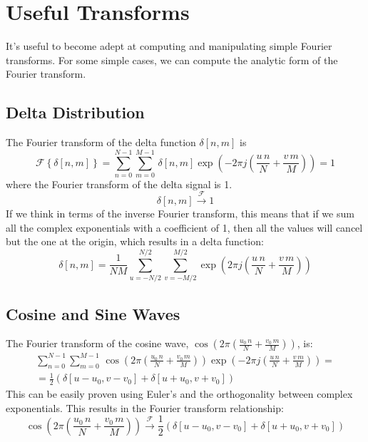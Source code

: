 \section{Useful Transforms}

It's useful to become adept at computing and manipulating
simple Fourier transforms.  For some simple cases, we can compute the analytic form of the Fourier transform.

\subsection{Delta Distribution}

The Fourier transform of the delta function $\delta \left[n,m \right]$ is
\begin{equation}
\mathcal{F} \left\{ \delta \left[n,m \right] \right\} = 
\sum_{n=0}^{N-1} \sum_{m=0}^{M-1} \, \delta \left[n,m \right] 
\exp{ \left( -2\pi j \left( \frac{u\, n}{N} + \frac{v\, m}{M} \right) \right)} = 1
\end{equation}
where the Fourier transform of the delta signal is 1. 
\begin{equation}
\delta \left[n,m \right] \xrightarrow{\mathscr{F}} 1
\end{equation}
If we think in terms of the inverse Fourier transform, this means that if we sum all the complex exponentials with a coefficient of 1, then all the values will cancel but the one at the origin, which results in a delta function:
\begin{equation}
\delta \left[n,m \right] = \frac{1}{NM} \sum_{u=-N/2}^{N/2} \sum_{v=-M/2}^{M/2}  
\exp{ \left(2\pi j \left(\frac{u\, n}{N} + \frac{v\, m}{M} \right) \right) }
\end{equation}

\subsection{Cosine and Sine Waves}

The Fourier transform of the cosine wave, $\cos{ \left( 2\pi \left( \frac{u_0\, n}{N} + \frac{v_0\, m}{M} \right) \right) }$, is:
\begin{eqnarray}
\sum_{n=0}^{N-1} \sum_{m=0}^{M-1} \, \cos{ \left( 2\pi \left( \frac{u_0 \, n}{N} + \frac{v_0 \, m}{M} \right) \right) }
\exp{ \left( -2\pi j \left( \frac{u\, n}{N} + \frac{v\, m}{M} \right) \right)} = \\ 
=\frac{1}{2} \left( \delta \left[u-u_0, v-v_0 \right] +  \delta \left[u+u_0, v+v_0 \right] \right)
\end{eqnarray}
This can be easily proven using Euler's \eqn{\ref{eq:euler}} and the orthogonality between complex exponentials. This results in the Fourier transform relationship: 
\begin{equation}
\cos{ \left( 2\pi \left( \frac{u_0\, n}{N} + \frac{v_0\, m}{M} \right) \right) } 
\xrightarrow{\mathscr{F}} 
\frac{1}{2} \left( \delta \left[u-u_0, v-v_0 \right] +  \delta \left[u+u_0, v+v_0 \right] \right)
\end{equation}

